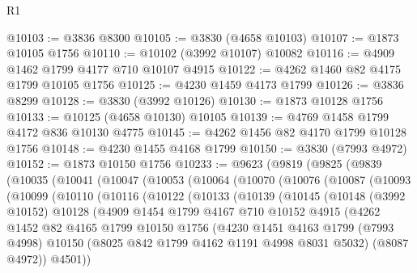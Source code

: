 \begin{lexlean}{R1}
\begin{coremodule}
@10103 := @3836 @8300
@10105 := @3830 (@4658 @10103)
@10107 := @1873 @10105 @1756
@10110 := @10102 (@3992 @10107) @10082
@10116 := @4909 @1462 @1799 @4177 @710 @10107 @4915
@10122 := @4262 @1460 @82 @4175 @1799 @10105 @1756
@10125 := @4230 @1459 @4173 @1799
@10126 := @3836 @8299
@10128 := @3830 (@3992 @10126)
@10130 := @1873 @10128 @1756
@10133 := @10125 (@4658 @10130) @10105
@10139 := @4769 @1458 @1799 @4172 @836 @10130 @4775
@10145 := @4262 @1456 @82 @4170 @1799 @10128 @1756
@10148 := @4230 @1455 @4168 @1799
@10150 := @3830 (@7993 @4972)
@10152 := @1873 @10150 @1756
@10233 := @9623
    (@9819
      (@9825
        (@9839
          (@10035
            (@10041
              (@10047
                (@10053
                  (@10064
                    (@10070
                      (@10076
                        (@10087
                          (@10093
                            (@10099
                              (@10110
                                (@10116
                                  (@10122
                                    (@10133
                                      (@10139
                                        (@10145
                                          (@10148
                                            (@3992 @10152)
                                            @10128
                                            (@4909
                                              @1454
                                              @1799
                                              @4167
                                              @710
                                              @10152
                                              @4915
                                              (@4262
                                                @1452
                                                @82
                                                @4165
                                                @1799
                                                @10150
                                                @1756
                                                (@4230
                                                  @1451
                                                  @4163
                                                  @1799
                                                  (@7993 @4998)
                                                  @10150
                                                  (@8025 @842 @1799 @4162 @1191 @4998 @8031 @5032)
                                                  (@8087 @4972))
                                                @4501))

\end{coremodule}
\end{lexlean}
